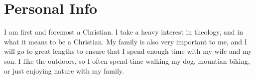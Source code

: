 \documentclass[a4paper]{twentysecondcv} %
\begin{document}
\section{Personal Info}

I am first and foremost a Christian. I take a heavy interest in theology, and in what it means to be a Christian.
My family is also very important to me, and I will go to great lengths to ensure that I spend enough time with my wife and my son.
I like the outdoors, so I often spend time walking my dog, mountian biking, or just enjoying nature with my family.
\end{document}
